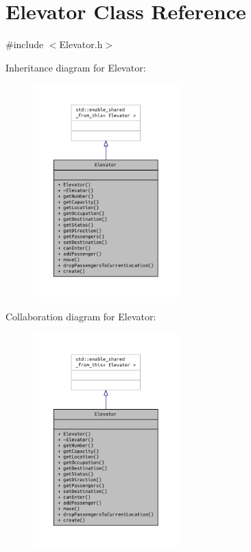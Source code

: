 \section{Elevator Class Reference}
\label{class_elevator}


{\ttfamily \#include $<$Elevator.\+h$>$}



Inheritance diagram for Elevator\+:
\nopagebreak
\begin{figure}[H]
\begin{center}
\leavevmode
\includegraphics[width=160pt]{class_elevator__inherit__graph}
\end{center}
\end{figure}


Collaboration diagram for Elevator\+:
\nopagebreak
\begin{figure}[H]
\begin{center}
\leavevmode
\includegraphics[width=160pt]{class_elevator__coll__graph}
\end{center}
\end{figure}
